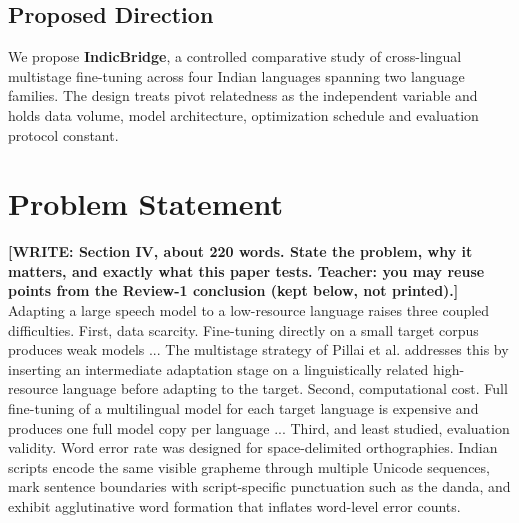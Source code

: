 \documentclass[conference]{IEEEtran}
\newcommand{\WRITE}[1]{{\color{red}\textbf{[WRITE: #1]}}}
\begin{document}
\subsection{Proposed Direction}

We propose \textbf{IndicBridge}, a controlled comparative study of
cross-lingual multistage fine-tuning across four Indian languages
spanning two language families. The design treats pivot relatedness as
the independent variable and holds data volume, model architecture,
optimization schedule and evaluation protocol constant.

\section{Problem Statement}
\WRITE{Section IV, about 220 words. State the problem, why it matters,
and exactly what this paper tests. Teacher: you may reuse points from the
Review-1 conclusion (kept below, not printed).}
%
\iffalse
Adapting a large speech model to a low-resource language raises three
coupled difficulties. First, data scarcity. Fine-tuning directly on a
small target corpus produces weak models ... The multistage strategy of
Pillai et al. addresses this by inserting an intermediate adaptation stage
on a linguistically related high-resource language before adapting to the
target. Second, computational cost. Full fine-tuning of a multilingual
model for each target language is expensive and produces one full model
copy per language ... Third, and least studied, evaluation validity. Word
error rate was designed for space-delimited orthographies. Indian scripts
encode the same visible grapheme through multiple Unicode sequences, mark
sentence boundaries with script-specific punctuation such as the danda,
and exhibit agglutinative word formation that inflates word-level error
counts.
\end{document}
